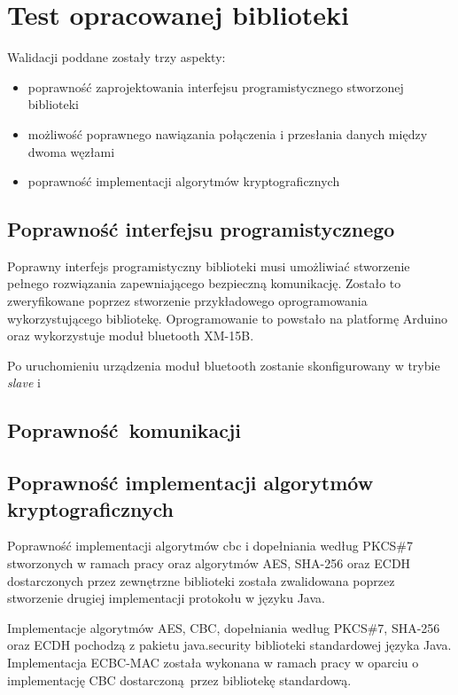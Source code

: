\chapter{Test opracowanej biblioteki}
\label{cha:walidacja}

Walidacji poddane zostały trzy aspekty:

\begin{itemize}
\item poprawność zaprojektowania interfejsu programistycznego stworzonej biblioteki
\item możliwość poprawnego nawiązania połączenia i przesłania danych między dwoma węzłami
\item poprawność implementacji algorytmów kryptograficznych
\end{itemize}

\section{Poprawność interfejsu programistycznego}

Poprawny interfejs programistyczny biblioteki musi umożliwiać stworzenie pełnego rozwiązania zapewniającego bezpieczną komunikację. Zostało to zweryfikowane poprzez stworzenie przykładowego oprogramowania wykorzystującego bibliotekę. Oprogramowanie to powstało na platformę Arduino oraz wykorzystuje moduł bluetooth XM-15B.

Po uruchomieniu urządzenia moduł bluetooth zostanie skonfigurowany w trybie \emph{slave} i 

\section{Poprawność komunikacji}

\section{Poprawność implementacji algorytmów kryptograficznych}

Poprawność implementacji algorytmów \gls{cbc} i dopełniania według PKCS\#7 stworzonych w ramach pracy oraz algorytmów AES, SHA-256 oraz ECDH dostarczonych przez zewnętrzne biblioteki została zwalidowana poprzez stworzenie drugiej implementacji protokołu w języku Java.

Implementacje algorytmów AES, CBC, dopełniania według PKCS\#7, SHA-256 oraz ECDH pochodzą z pakietu java.security biblioteki standardowej języka Java. Implementacja ECBC-MAC została wykonana w ramach pracy w oparciu o implementację CBC dostarczoną przez bibliotekę standardową.
